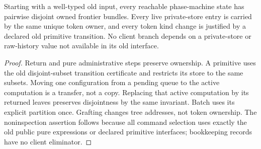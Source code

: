 \documentclass[11pt]{article}
\begin{document}
\begin{proposition}
Starting with a well-typed old input, every reachable phase-machine state has pairwise disjoint owned frontier bundles. Every live private-store entry is carried by the same unique token owner, and every token kind change is justified by a declared old primitive transition. No client branch depends on a private-store or raw-history value not available in its old interface.
\end{proposition}
\begin{proof}
Return and pure administrative steps preserve ownership. A primitive uses the old disjoint-subset transition certificate and restricts its store to the same subsets. Moving one configuration from a pending queue to the active computation is a transfer, not a copy. Replacing that active computation by its returned leaves preserves disjointness by the same invariant. Batch uses its explicit partition once. Grafting changes tree addresses, not token ownership. The noninspection assertion follows because all command selection uses exactly the old public pure expressions or declared primitive interfaces; bookkeeping records have no client eliminator.
\end{proof}
\end{document}
